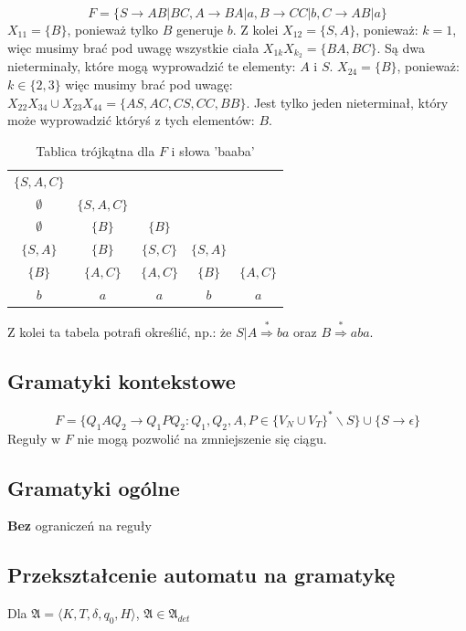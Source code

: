 \documentclass{../notatki}
\begin{document}
$$
F = \{S \rightarrow AB | BC, A \rightarrow BA | a, B \rightarrow CC |
b, C \rightarrow AB | a\}
$$
$X_{11} = \{B\}$, ponieważ tylko $B$ generuje $b$. Z kolei $X_{12} = \{S, A\}$,
ponieważ: $k = 1$, więc musimy brać pod uwagę wszystkie ciała
$X_{1k}X_{k_2} = \{BA, BC\}$. Są dwa nieterminały, które mogą
wyprowadzić te elementy: $A$ i $S$.
$X_{24} = \{B\}$, ponieważ: $k \in \{2, 3\}$ więc musimy brać pod uwagę:
$X_{22}X_{34} \cup X_{23}X_{44} = \{AS, AC, CS, CC, BB\}$. Jest tylko jeden
nieterminał, który może wyprowadzić któryś z tych elementów: $B$.
\begin{table}[h]
  \centering
  \begin{tabular}{|ccccc}
    $\{S, A, C\}$ & & & & \\
    $\emptyset$ & $\{S, A, C\}$ & & & \\
    $\emptyset$ & $\{B\}$ & $\{B\}$ & & \\
    $\{S, A\}$ & $\{B\}$ & $\{S, C\}$ & $\{S, A\}$ & \\
    $\{B\}$ & $\{A, C\}$ & $\{A, C\}$ & $\{B\}$ & $\{A, C\}$ \\
    \hline
    $b$ & $a$ & $a$ & $b$ & $a$
  \end{tabular}
  \caption{Tablica trójkątna dla $F$ i słowa 'baaba'}
\end{table}

Z kolei ta tabela potrafi określić, np.: że $S | A
\stackrel{*}{\Rightarrow} ba$ oraz $B \stackrel{*}{\Rightarrow} aba$.

\subsection{Gramatyki kontekstowe}

$$
F = \{Q_1AQ_2 \rightarrow Q_1PQ_2 : Q_1, Q_2, A, P \in \{V_N \cup
V_T\}^* \backslash S\} \cup \{S \rightarrow \epsilon\}
$$
Reguły w $F$ nie mogą pozwolić na zmniejszenie się ciągu.

\subsection{Gramatyki ogólne}

\textbf{Bez} ograniczeń na reguły

\subsection{Przekształcenie automatu na gramatykę}

Dla $\mathfrak{A} = \langle K,T,\delta,q_0,H \rangle$, $\mathfrak{A}
\in \mathfrak{A}_{det}$
\end{document}
